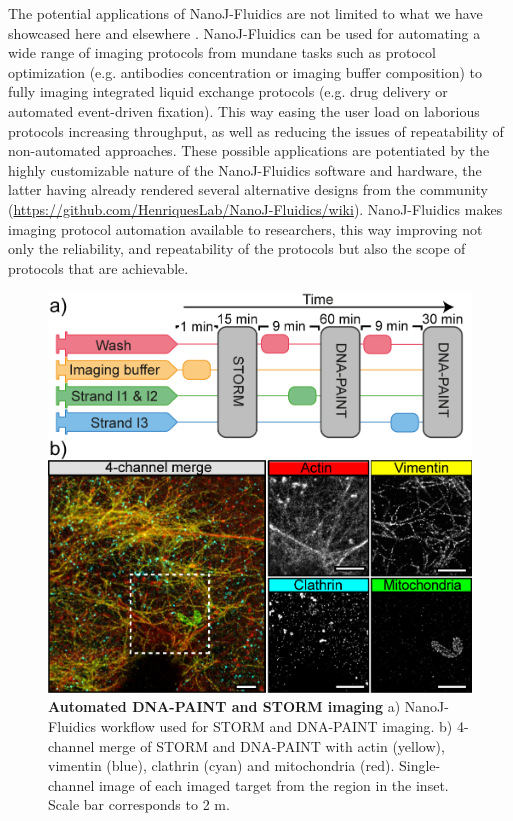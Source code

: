 The potential applications of NanoJ-Fluidics are not limited to what we have showcased here and elsewhere \cite{almada2018automating}. NanoJ-Fluidics can be used for automating a wide range of imaging protocols from mundane tasks such as protocol optimization (e.g. antibodies concentration or imaging buffer composition) to fully imaging integrated liquid exchange protocols (e.g. drug delivery or automated event-driven fixation). This way easing the user load on laborious protocols increasing throughput, as well as reducing the issues of repeatability of non-automated approaches. These possible applications are potentiated by the highly customizable nature of the NanoJ-Fluidics software and hardware, the latter having already rendered several alternative designs from the community (\href{https://github.com/HenriquesLab/NanoJ-Fluidics/wiki}{https://github.com/HenriquesLab/NanoJ-Fluidics/wiki}). NanoJ-Fluidics makes imaging protocol automation available to researchers, this way improving not only the reliability, and repeatability of the protocols but also the scope of protocols that are achievable.  

\begin{figure}[!t]
    \centering
    \includegraphics[width=\linewidth]{Figures/PAINT.png}
    \caption{\textbf{Automated DNA-PAINT and STORM imaging} a) NanoJ-Fluidics workflow used for STORM and DNA-PAINT imaging. b) 4-channel merge of STORM and DNA-PAINT with actin (yellow), vimentin (blue), clathrin (cyan) and mitochondria (red). Single-channel image of each imaged target from the region in the inset. Scale bar corresponds to 2 \textmu{}m.}
    \label{fig:PAINT}
\end{figure}

